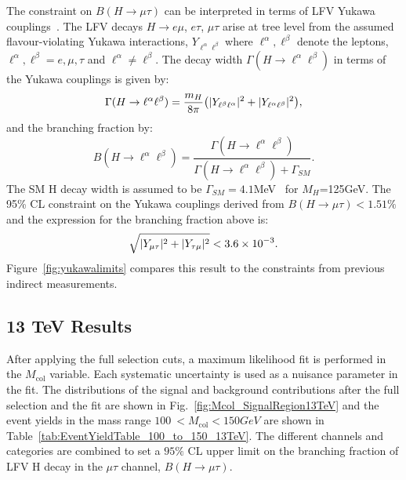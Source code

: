 \documentclass[oneside, letterpaper, oldfontcommands]{memoir}
\DeclarePairedDelimiter{\abs}{\lvert}{\rvert}
\begin{document}
The constraint on $B(H \rightarrow \mu \tau )$ can be interpreted in terms of LFV  Yukawa couplings~\cite{Harnik:2012pb}.
The LFV decays $H \rightarrow e\mu$, $e\tau$, $\mu\tau$ arise at tree level from the assumed
flavour-violating Yukawa interactions, $Y_{\ell^{\alpha}\ell^{\beta}}$ where $\ell^{\alpha},\ell^{\beta}$ denote the leptons, $\ell^{\alpha},\ell^{\beta}=e,\mu,\tau$ and $\ell^{\alpha}\neq \ell^{\beta}$.
The decay width $\Gamma(H \rightarrow \ell^{\alpha}\ell^{\beta})$  in terms of the Yukawa couplings is given by:
\begin{equation*}
\Gamma(H \rightarrow \ell^{\alpha}\ell^{\beta})=\frac{m_{H}}{8\pi}\bigl(\abs{Y_{\ell^{\beta}\ell^{\alpha}}}^2 + \abs{Y_{\ell^{\alpha}\ell^{\beta}}}^2\bigr),
\end{equation*}
and the branching fraction by:
\begin{equation*}
B(H \rightarrow \ell^{\alpha}\ell^{\beta})=\frac{\Gamma(H\rightarrow \ell^{\alpha}\ell^{\beta})}{\Gamma(H\rightarrow \ell^{\alpha}\ell^{\beta}) + \Gamma_{SM}}.
\end{equation*}
The SM H decay width is assumed to be $\Gamma_{SM}=4.1$MeV~\cite{Denner:2011mq} for $M_{H}$=125GeV.
The 95\% CL constraint on the Yukawa couplings derived from $B(H \rightarrow \mu \tau )<1.51\%$ and the expression for the branching fraction above is:\begin{equation*}
\sqrt{\abs{Y_{\mu\tau}}^{2}+\abs{Y_{\tau\mu}}^{2}}<3.6\times 10^{-3}.
\end{equation*}
Figure~\ref{fig:yukawalimits} compares this result to the constraints from previous indirect
measurements.
\subsection{13 TeV Results}
After applying the full selection cuts, a maximum likelihood fit is performed in the $M_\text{col}$ variable. Each systematic uncertainty is used as a nuisance parameter in the fit. The distributions of the signal and background contributions after the full selection and the fit are shown in Fig.~\ref{fig:Mcol_SignalRegion13TeV} and the
event yields in the mass range $100\:  < M_\text{col} < 150GeV$ are shown in Table~\ref{tab:EventYieldTable_100_to_150_13TeV}.
The different channels and categories are combined  to set a $95\%$ CL  upper limit on the branching
fraction of LFV H decay in the  $\mu\tau$ channel, $B(H\rightarrow\mu\tau)$.
\end{document}
